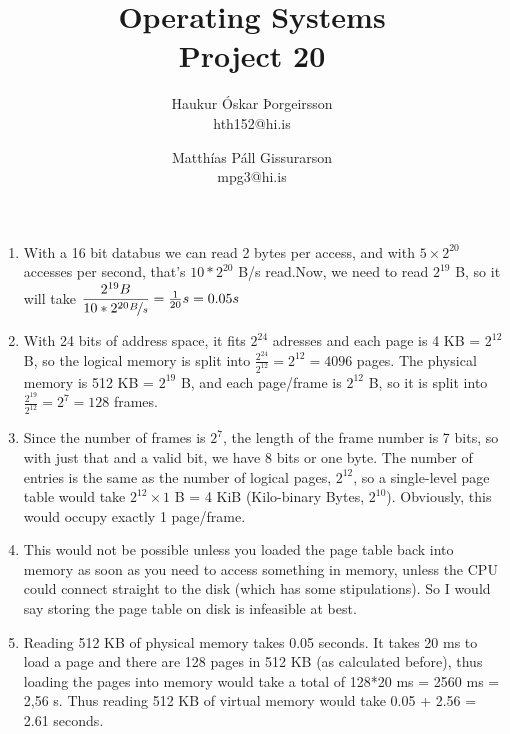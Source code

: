\documentclass[a4]{article}
\title{Operating Systems\\
Project 20}
\author{           
    Haukur Óskar Þorgeirsson\\
    hth152@hi.is \and
    Matthías Páll Gissurarson\\
    mpg3@hi.is
}
\begin{document}
\maketitle

\begin{enumerate}

\item With a 16 bit databus we can read 2 bytes per access, and with $5 \times 2^{20}$ accesses per second, that's $10*2^{20}$ B/s read.Now, we need to read $2^{19}$ B, so it will take $\dfrac{2^{19} B}{10*2^{20} \nicefrac{B}{s}} = \frac{1}{20} s = 0.05 s$

\item With 24 bits of address space, it fits $2^{24}$ adresses and each page is 4 KB = $2^{12}$ B, so the logical memory is split into $\frac{2^{24}}{2^{12}}=2^{12}=4096$ pages. The physical memory is 512 KB = $2^{19}$ B, and each page/frame is $2^{12}$ B, so it is split into $\frac{2^{19}}{2^{12}}=2^{7}=128$ frames.

\item Since the number of frames is $2^{7}$, the length of the frame number is 7 bits, so with just that and a valid bit, we have 8 bits or one byte. The number of entries is the same as the number of logical pages, $2^{12}$, so a single-level page table would take $2^{12} \times 1$ B = 4 KiB (Kilo-binary Bytes, $2^{10}$). Obviously, this would occupy exactly 1 page/frame.

\item This would not be possible unless you loaded the page table back into memory as soon as you need to access something in memory, unless the CPU could connect straight to the disk (which has some stipulations). So I would say storing the page table on disk is infeasible at best.

\item Reading 512 KB of physical memory takes 0.05 seconds. It takes 20 ms to load a page and there are 128 pages in 512 KB (as calculated before), thus loading the pages into memory would take a total of 128*20 ms = 2560 ms = 2,56 s. Thus reading 512 KB of virtual memory would take 0.05 + 2.56 = 2.61 seconds.

\end{enumerate}
\end{document}
